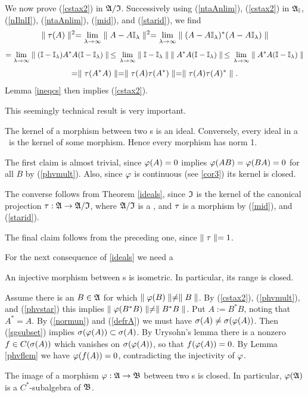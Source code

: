 We now prove (\ref{cstax2}) in ${\frak A}/{\frak I}$.  Successively using
(\ref{ntaAnlim}), (\ref{cstax2}) in ${\frak A}_{\Bbb I}$, (\ref{nIlnlI}),
(\ref{ntaAnlim}), (\ref{mid}), and (\ref{starid}), we find
$$
\parallel\tau(A)\parallel^2= \lim_{\lambda\rightarrow\infty} \parallel
A-A{\Bbb I}_{\lambda}\parallel^2=\lim_{\lambda\rightarrow\infty} \parallel
(A-A{\Bbb I}_{\lambda})^*(A-A{\Bbb I}_{\lambda})\parallel$$ $$ =\lim_{\lambda\rightarrow\infty}\parallel
({\Bbb I}-{\Bbb I}_{\lambda})A^*A ({\Bbb I}-{\Bbb I}_{\lambda})\parallel\,\leq\, \lim_{\lambda\rightarrow\infty}
\parallel{\Bbb I}-{\Bbb I}_{\lambda}\parallel\: \parallel A^*A ({\Bbb I}-{\Bbb I}_{\lambda})\parallel\,\leq\,
\lim_{\lambda\rightarrow\infty}\parallel A^*A ({\Bbb I}-{\Bbb I}_{\lambda})\parallel $$ $$ =
\parallel\tau(A^*A)\parallel=\parallel\tau(A)\tau(A^*)\parallel=\parallel\tau(A)\tau(A)^*\parallel. $$ Lemma
\ref{ineqcs} then implies (\ref{cstax2}).\enp

This seemingly technical result is very important.
\begin{Corollary}
The kernel of a morphism between two \ca s is an ideal. Conversely,
every ideal in a \ca\ is the kernel of some morphism. Hence every
morphism has norm 1. \end{Corollary}

The first claim is almost trivial, since $\varphi(A)=0$ implies
$\varphi(AB)=\varphi(BA)=0$ for all $B$ by (\ref{phvmult}). Also, since
$\varphi$ is continuous (see \ref{cor3}) its kernel is closed.

The converse follows from Theorem \ref{ideals}, since ${\frak I}$ is the
kernel of the canonical projection $\tau:{\frak A}\rightarrow{\frak A}/{\frak I}$, where ${\frak A}/{\frak I}$
is a \ca, and $\tau$ is a morphism by (\ref{mid}), and (\ref{starid}).

The final claim follows from the preceding one, since $\parallel\tau\parallel=1$.\enp

For the next consequence of \ref{ideals} we need a
\begin{Lemma}
An injective morphism between \ca s is isometric. In particular, its
range is closed.
\end{Lemma}

Assume there is an $B\in{\frak A}$ for which $\parallel\varphi(B)\parallel\neq\parallel B\parallel$. By
(\ref{cstax2}), (\ref{phvmult}), and (\ref{phvstar}) this implies
$\parallel\varphi(B^*B)\parallel\neq\parallel B^*B\parallel$.  Put $A:=B^*B$, noting that $A^*=A$.
By (\ref{normun}) and (\ref{defrA}) we must have
$\sigma(A)\neq\sigma(\varphi(A))$.  Then (\ref{sgsubset}) implies
$\sigma(\varphi(A))\subset \sigma(A)$.  By Urysohn's lemma there is a nonzero
$f\in C(\sigma(A))$ which vanishes on $\sigma(\varphi(A))$, so that
$f(\varphi(A))=0$. By Lemma \ref{phvflem} we have $\varphi(f(A))=0$,
contradicting the injectivity of $\varphi$.\enp
\begin{Corollary}
The image of a morphism $\varphi:{\frak A}\rightarrow{\frak B}$ between two \ca s is
closed. In particular, $\varphi({\frak A})$ is a $C^*$-subalgebra of
${\frak B}$. \end{Corollary}


